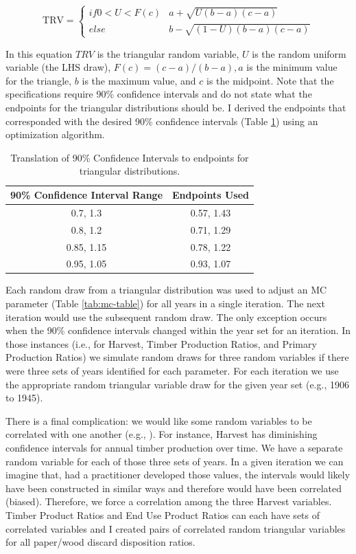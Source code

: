 \documentclass[
  openany]{book}
\begin{document}
\[   \text{TRV} =
  \begin{cases}
    if 0 < U < F(c)       & a + \sqrt{U(b-a)(c-a)}\\
    else  & b - \sqrt{(1-U)(b-a)(c-a)}
  \end{cases} \]

In this equation \(TRV\) is the triangular random variable, \(U\) is the random uniform variable (the LHS draw), \(F(c)=(c-a)/(b-a), a\) is the minimum value for the triangle, \(b\) is the maximum value, and \(c\) is the midpoint. Note that the specifications require 90\% confidence intervals and do not state what the endpoints for the triangular distributions should be. I derived the endpoints that corresponded with the desired 90\% confidence intervals (Table \ref{tab:triang-tab}) using an optimization algorithm.

\begin{table}

\caption{\label{tab:triang-tab}Translation of 90\% Confidence Intervals to endpoints for triangular distributions.}
\centering
\begin{tabular}[t]{cc}
\toprule
90\% Confidence Interval Range & Endpoints Used\\
\midrule
0.7, 1.3 & 0.57, 1.43\\
0.8, 1.2 & 0.71, 1.29\\
0.85, 1.15 & 0.78, 1.22\\
0.95, 1.05 & 0.93, 1.07\\
\bottomrule
\end{tabular}
\end{table}

Each random draw from a triangular distribution was used to adjust an MC parameter (Table \ref{tab:mc-table}) for all years in a single iteration. The next iteration would use the subsequent random draw. The only exception occurs when the 90\% confidence intervals changed within the year set for an iteration. In those instances (i.e., for Harvest, Timber Production Ratios, and Primary Production Ratios) we simulate random draws for three random variables if there were three sets of years identified for each parameter. For each iteration we use the appropriate random triangular variable draw for the given year set (e.g., 1906 to 1945).

There is a final complication: we would like some random variables to be correlated with one another (e.g., \textcite{stockmann2012}). For instance, Harvest has diminishing confidence intervals for annual timber production over time. We have a separate random variable for each of those three sets of years. In a given iteration we can imagine that, had a practitioner developed those values, the intervals would likely have been constructed in similar ways and therefore would have been correlated (biased). Therefore, we force a correlation among the three Harvest variables. Timber Product Ratios and End Use Product Ratios can each have sets of correlated variables and I created pairs of correlated random triangular variables for all paper/wood discard disposition ratios.
\end{document}
